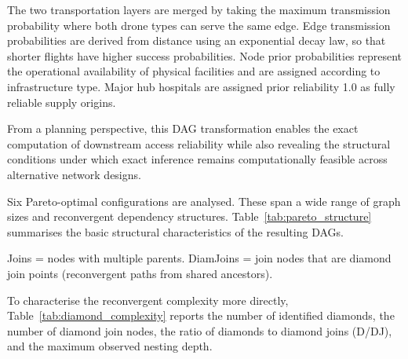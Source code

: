 \documentclass[preprint,12pt]{elsarticle}
\begin{document}
The two transportation layers are merged by taking the maximum transmission probability where both drone types can serve the same edge. Edge transmission probabilities are derived from distance using an exponential decay law, so that shorter flights have higher success probabilities. Node prior probabilities represent the operational availability of physical facilities and are assigned according to infrastructure type. Major hub hospitals are assigned prior reliability 1.0 as fully reliable supply origins.

From a planning perspective, this DAG transformation enables the exact computation of downstream access reliability while also revealing the structural conditions under which exact inference remains computationally feasible across alternative network designs.

Six Pareto-optimal configurations are analysed. These span a wide range of graph sizes and reconvergent dependency structures. Table~\ref{tab:pareto_structure} summarises the basic structural characteristics of the resulting DAGs.

\begin{table}[ht]
\caption{Structural characteristics of Pareto-optimal drone network DAGs}
\label{tab:pareto_structure}
\centering
{}
\begin{minipage}{\textwidth}
\footnotesize
Joins = nodes with multiple parents. DiamJoins = join nodes that are diamond join points (reconvergent paths from shared ancestors).
\end{minipage}
\end{table}

To characterise the reconvergent complexity more directly, Table~\ref{tab:diamond_complexity} reports the number of identified diamonds, the number of diamond join nodes, the ratio of diamonds to diamond joins (D/DJ), and the maximum observed nesting depth.
\end{document}
